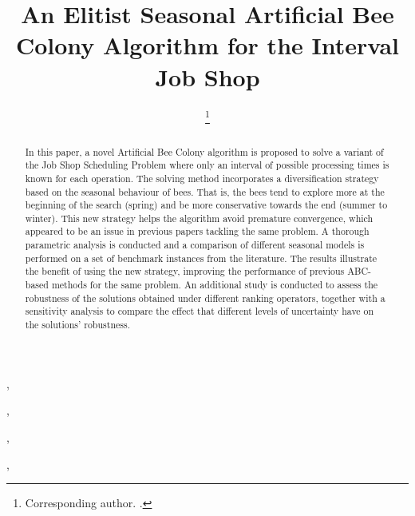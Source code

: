 \documentclass[icae]{iosart2x}
\newcommand{\reviewed}[1]{#1} %
\begin{document}
\begin{frontmatter}

\title{An Elitist Seasonal Artificial Bee Colony Algorithm for the Interval Job Shop}


\author[UO]{ }, %
\author[UO]{ },
\author[UC]{ },
\author[UO]{ \thanks{Corresponding author. .}},


\address[UO]{Dep. of Computing, ,
Gij\'on, }
\address[UC]{Dep. Matem\'aticas, Estad\'{\i}stica y Computaci\'on, ,
Santander, }

\begin{abstract}
In this paper, a novel Artificial Bee Colony algorithm is proposed to solve a variant of the Job Shop Scheduling Problem where only an interval of possible processing times is known for each operation. The solving method incorporates a diversification strategy based on the seasonal behaviour of bees. That is, the bees tend to explore more at the beginning of the \reviewed{search} (spring) and be more conservative towards the end (summer to winter). This new strategy helps the algorithm avoid premature \reviewed{convergence}, which appeared to be \reviewed{an issue} in previous papers tackling the same problem. A thorough parametric analysis is conducted and a comparison of different seasonal models is performed on a set of benchmark instances from the literature. The results illustrate the benefit of using the new strategy, improving the performance of previous ABC-based methods for the same problem. An additional study is conducted to assess the robustness of the solutions obtained under different ranking operators, together with a sensitivity analysis to compare the effect that different levels of uncertainty have on the solutions' robustness.
\end{abstract}

\begin{keyword}
\end{keyword}

\end{frontmatter}
\end{document}
